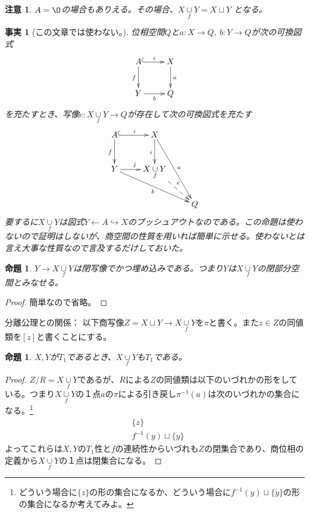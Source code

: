 \documentclass[leqno]{jsarticle}
\newtheorem{prop}[thm]{命題}
\newtheorem{fact}[thm]{事実}
\newtheorem*{cau}{注意}
\newcommand{\qt}[2]{#1/\! #2}
\newcommand{\main}{X\underset{f}{\cup} Y}
\begin{document}
\begin{cau}
$A=\O$の場合もありえる。その場合、$\main=X\sqcup Y$	となる。
\end{cau}
\begin{fact}[この文章では使わない。]
位相空間$Q$と$a:X\to Q,\ b:Y\to Q$が次の可換図式
\[\xymatrix{
& A \ar@{^{(}->}[r]^{\iota}\ar@{->}[d]_f& X \ar@{->}[d]^{a}&\\ 
& Y \ar@{->}[r]_{b}& Q &
}\]
を充たすとき、写像$e:X\underset{f}{\cup} Y\to Q$が存在して次の可換図式を充たす
\[\xymatrix{
& A \ar@{^{(}->}[r]^{\iota}\ar@{->}[d]_f& X \ar@{->}[d]_{i}\ar@{->}[rdd]^a&\\ 
& Y \ar@{->}[r]^{j}\ar@{->}[rrd]_b& X\underset{f}{\cup} Y \ar@{-->}[rd]^e &\\ 
&   &   &  Q&
}\]
要するに$X\underset{f}{\cup} Y$は図式$Y\gets A\hookrightarrow X$のプッシュアウトなのである。この命題は使わないので証明はしないが、商空間の性質を用いれば簡単に示せる。使わないとは言え大事な性質なので言及するだけしておいた。
\end{fact}
\begin{prop}\label{Y}
$Y\to \main$は閉写像でかつ埋め込みである。つまり$Y$は$\main$の閉部分空間とみなせる。
\end{prop}
\begin{proof}
簡単なので省略。
\end{proof}

分離公理との関係：
以下商写像$Z=X\sqcup Y\to X\underset{f}{\cup} Y$を$\pi$と書く。また$z\in Z$の同値類を$[z]$と書くことにする。
\begin{prop}
$X,Y$が$T_1$であるとき、$X\underset{f}{\cup} Y$も$T_1$である。
\end{prop}
\begin{proof}
$\qt{Z}{R}=X\underset{f}{\cup} Y$であるが、$R$による$Z$の同値類は以下のいづれかの形をしている。つまり$X\underset{f}{\cup} Y$の１点$a$の$\pi$による引き戻し$\pi^{-1}(a)$は次のいづれかの集合になる。\footnote{どういう場合に$\{z\}$の形の集合になるか、どういう場合に$f^{-1}(y)\sqcup \{y\}$の形の集合になるか考えてみよ。}
\begin{align*}
&\{z\}\\
 &f^{-1}(y)\sqcup \{y\}
\end{align*}
よってこれらは$X,Y$の$T_1$性と$f$の連続性からいづれも$Z$の閉集合であり、商位相の定義から$X\underset{f}{\cup} Y$の１点は閉集合になる。
\end{proof}
\end{document}
